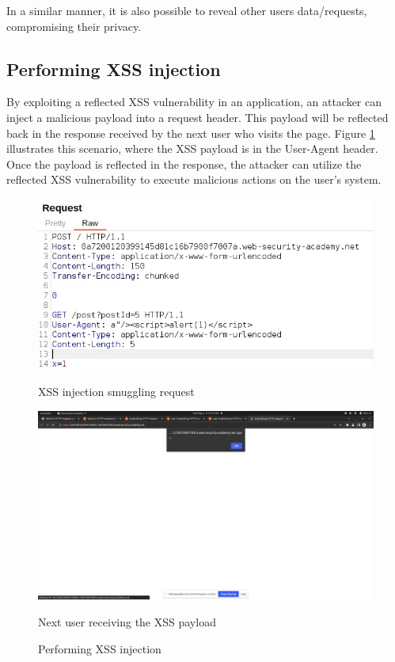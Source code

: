 \documentclass[conference]{IEEEtran}
\begin{document}
In a similar manner, it is also possible to reveal other users data/requests, compromising their privacy.

\subsection*{Performing XSS injection}
By exploiting a reflected XSS vulnerability in an application, an attacker can inject a malicious payload into a request header. This payload will be reflected back in the response received by the next user who visits the page. Figure \ref*{fig:xss} illustrates this scenario, where the XSS payload is in the User-Agent header. Once the payload is reflected in the response, the attacker can utilize the reflected XSS vulnerability to execute malicious actions on the user's system.

\begin{figure}[htbp]
	\centering
	\begin{minipage}[c]{0.45\linewidth}
		\centering
		\includegraphics[width=\linewidth]{results/XSS_injection_code.jpeg}
		\captionsetup{justification=centering}
		\caption*{XSS injection smuggling request}
		\label{fig:xss_req}
	  \end{minipage}
	  \hfill
	  \begin{minipage}[c]{0.45\linewidth}
		\centering
		\includegraphics[width=\linewidth]{results/XSS_injection_result.jpeg}
		\captionsetup{justification=centering}
		\caption*{Next user receiving the XSS payload}
		\label{fig:xss_response}
	  \end{minipage}
	
	  \caption{Performing XSS injection}
	  \label{fig:xss}
\end{figure}
\end{document}
